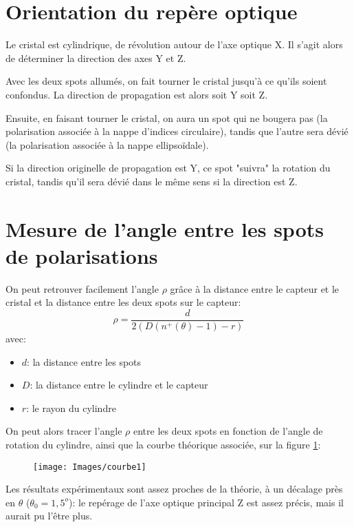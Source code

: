 \documentclass[a4paper,11pt]{report}
\begin{document}
\section{Orientation du repère optique}
Le cristal est cylindrique, de révolution autour de l'axe optique X. Il s'agit alors de déterminer la direction des axes Y et Z.

Avec les deux spots allumés, on fait tourner le cristal jusqu'à ce qu'ils soient confondus. La direction de propagation est alors soit Y soit Z.

Ensuite, en faisant tourner le cristal, on aura un spot qui ne bougera pas (la polarisation associée à la nappe d'indices circulaire), tandis que l'autre sera dévié (la polarisation associée à la nappe ellipsoïdale).

Si la direction originelle de propagation est Y, ce spot "suivra" la rotation du cristal, tandis qu'il sera dévié dans le même sens si la direction est Z.

\section{Mesure de l'angle entre les spots de polarisations}
On peut retrouver facilement l'angle $\rho$ grâce à la distance entre le capteur et le cristal et la distance entre les deux spots sur le capteur: 
\[  \rho = \frac{d}{2(D(n^+(\theta)-1)-r)} \]
avec:
\begin{itemize}
    \item $d$: la distance entre les spots
    \item $D$: la distance entre le cylindre et le capteur
    \item $r$: le rayon du cylindre
\end{itemize}
\vspace*{0.5cm}
On peut alors tracer l'angle $\rho$ entre les deux spots en fonction de l'angle de rotation du cylindre, ainsi que la courbe théorique associée, sur la figure \ref{courbe1}:

\begin{figure}[h]
    \begin{center}
        \texttt{[image: Images/courbe1]}
        \caption{}
        \label{courbe1}
    \end{center}
\end{figure}

Les résultats expérimentaux sont assez proches de la théorie, à un décalage près en $\theta$ ($\theta_0 = 1,5^o$): le repérage de l'axe optique principal Z est assez précis, mais il aurait pu l'être plus.
\end{document}
